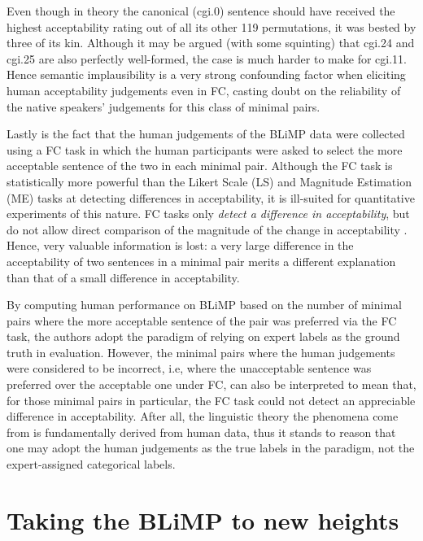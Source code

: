 Even though in theory the canonical (cgi.0) sentence should have received the highest acceptability rating out of all its other 119 permutations, it was bested by three of its kin.  Although it may be argued (with some squinting) that cgi.24 and cgi.25 are also perfectly well-formed, the case is much harder to make for cgi.11.  Hence semantic implausibility is a very strong confounding factor when eliciting human acceptability judgements even in FC, casting doubt on the reliability of the native speakers' judgements for this class of minimal pairs.

Lastly is the fact that the human judgements of the BLiMP data were collected using a FC task in which the human participants were asked to select the more acceptable sentence of the two in each minimal pair.  Although the FC task is statistically more powerful than the Likert Scale (LS) and Magnitude Estimation (ME) tasks at detecting differences in acceptability, it is ill-suited for quantitative experiments of this nature.  FC tasks only \textit{detect a difference in acceptability}, but do not allow direct comparison of the magnitude of the change in acceptability \citep{schutze}.  Hence, very valuable information is lost: a very large difference in the acceptability of two sentences in a minimal pair merits a different explanation than that of a small difference in acceptability. 

By computing human performance on BLiMP based on the number of minimal pairs where the more acceptable sentence of the pair was preferred via the FC task, the authors adopt the paradigm of relying on expert labels as the ground truth in evaluation.  However, the minimal pairs where the human judgements were considered to be incorrect, i.e, where the unacceptable sentence was preferred over the acceptable one under FC, can also be interpreted to mean that, for those minimal pairs in particular, the FC task could not detect an appreciable difference in acceptability.  After all, the linguistic theory the phenomena come from is fundamentally derived from human data, thus it stands to reason that one may adopt the human judgements as the true labels in the paradigm, not the expert-assigned categorical labels.

\section{Taking the BLiMP to new heights}


